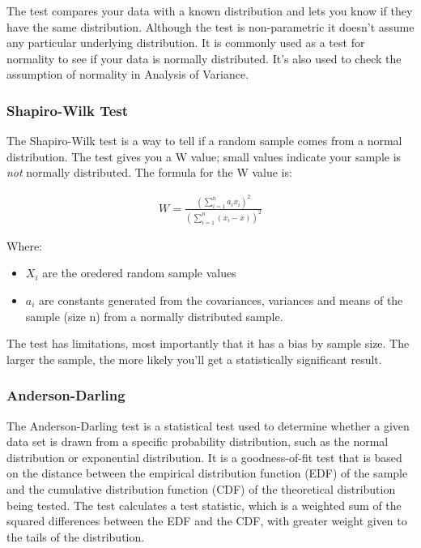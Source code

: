 \documentclass[11pt]{article}
\begin{document}
The test compares your data with a known distribution and lets you know
if they have the same distribution. Although the test is non-parametric
it doesn't assume any particular underlying distribution. It is commonly
used as a test for normality to see if your data is normally
distributed. It's also used to check the assumption of normality in
Analysis of Variance.

\hypertarget{shapiro-wilk-test}{%
\subsubsection{Shapiro-Wilk Test}\label{shapiro-wilk-test}}

The Shapiro-Wilk test is a way to tell if a random sample comes from a
normal distribution. The test gives you a W value; small values indicate
your sample is \emph{not} normally distributed. The formula for the W
value is: 

\begin{gather}
  W=\frac{\left (\sum_{i=1}^n a_i x_i \right )^2}{(\sum_{i=1}^n (x_i - \overline{x}))^2}
\end{gather}

Where: 
\begin{itemize}
  \item \(X_i\) are the oredered random sample values
  \item \(a_i\) are constants generated from the covariances, variances and means of the
  sample (size n) from a normally distributed sample.
\end{itemize}

The test has limitations, most importantly that it has a bias by sample
size. The larger the sample, the more likely you'll get a statistically
significant result.

\hypertarget{anderson-darling}{%
\subsubsection{Anderson-Darling}\label{anderson-darling}}

The Anderson-Darling test is a statistical test used to determine
whether a given data set is drawn from a specific probability
distribution, such as the normal distribution or exponential
distribution. It is a goodness-of-fit test that is based on the distance
between the empirical distribution function (EDF) of the sample and the
cumulative distribution function (CDF) of the theoretical distribution
being tested. The test calculates a test statistic, which is a weighted
sum of the squared differences between the EDF and the CDF, with greater
weight given to the tails of the distribution.
\end{document}
